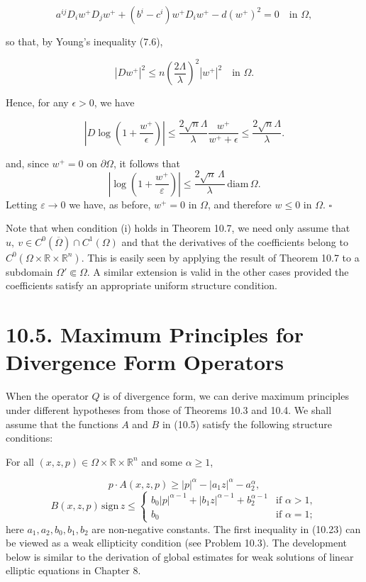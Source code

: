 \[
a^{ij}D_i w^+ D_j w^+ + (b^i - c^i)w^+ D_i w^+ - d(w^+)^2 = 0 \quad \text{in } \Omega,
\]

so that, by Young's inequality (7.6),

\[
|Dw^+|^2 \le n\left(\frac{2\Lambda}{\lambda}\right)^2 |w^+|^2 \quad \text{in } \Omega.
\]

Hence, for any $\epsilon > 0$, we have

\[
\left|D \log \left(1 + \frac{w^+}{\epsilon}\right)\right|
\le \frac{2\sqrt{n}\Lambda}{\lambda}\frac{w^+}{w^+ + \epsilon}
\le \frac{2\sqrt{n}\Lambda}{\lambda}.
\]



and, since $w^+=0$ on $\partial\Omega$, it follows that
\[
\left|\log\left(1+\frac{w^+}{\varepsilon}\right)\right|\le \frac{2\sqrt{n}\,\Lambda}{\lambda}\,\mathrm{diam}\,\Omega.
\]
Letting $\varepsilon\to 0$ we have, as before, $w^+=0$ in $\Omega$, and therefore $w\le 0$ in $\Omega$. $\square$

Note that when condition (i) holds in Theorem 10.7, we need only assume that $u,\ v\in C^0(\overline{\Omega})\cap C^1(\Omega)$ and that the derivatives of the coefficients belong to $C^0(\Omega\times\mathbb{R}\times\mathbb{R}^n)$. This is easily seen by applying the result of Theorem 10.7 to a subdomain $\Omega'\Subset\Omega$. A similar extension is valid in the other cases provided the coefficients satisfy an appropriate uniform structure condition.

\section*{10.5. Maximum Principles for Divergence Form Operators}

When the operator $Q$ is of divergence form, we can derive maximum principles under different hypotheses from those of Theorems 10.3 and 10.4. We shall assume that the functions $A$ and $B$ in (10.5) satisfy the following structure conditions:

For all $(x,z,p)\in\Omega\times\mathbb{R}\times\mathbb{R}^n$ and some $\alpha\ge 1$,

\begin{equation}
\tag{10.23}
 p\cdot A(x,z,p)\ge |p|^\alpha-|a_1 z|^\alpha-a_2^\alpha,
\end{equation}
\[
B(x,z,p)\,\mathrm{sign}\,z\le
\begin{cases}
 b_0|p|^{\alpha-1}+|b_1 z|^{\alpha-1}+b_2^{\alpha-1} & \text{if }\alpha>1,\\
 b_0 & \text{if }\alpha=1;
\end{cases}
\]
here $a_1,a_2,b_0,b_1,b_2$ are non-negative constants. The first inequality in (10.23) can be viewed as a weak ellipticity condition (see Problem 10.3). The development below is similar to the derivation of global estimates for weak solutions of linear elliptic equations in Chapter 8.

